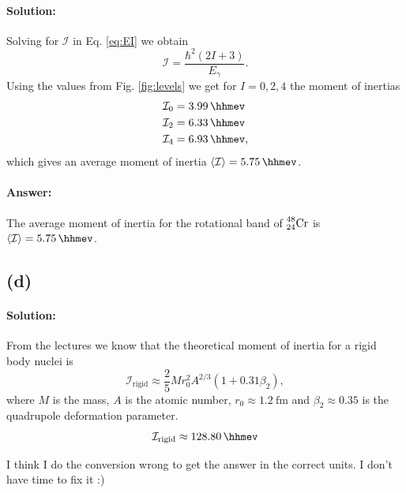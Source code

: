 \paragraph{Solution:} Solving for $\mathcal{I}$ in Eq. \eqref{eq:EI} we obtain
\begin{equation}
	\mathcal{I} = \frac{\hbar^2(2I + 3)}{E_\gamma}.
\end{equation}
Using the values from Fig. \ref{fig:levels} we get for $I = 0, 2, 4$ the moment of inertias
\begin{align}
	\mathcal{I}_0 &= \SI{3.99}{\hhmev}\\
	\mathcal{I}_2 &= \SI{6.33}{\hhmev}\\
	\mathcal{I}_4 &= \SI{6.93}{\hhmev},
\end{align}
which gives an average moment of inertia $\langle \mathcal{I} \rangle = \SI{5.75}{\hhmev}$.

\paragraph{Answer:} The average moment of inertia for the rotational band of $\nuc{Cr}{48}{24}$ is $\langle \mathcal{I} \rangle = \SI{5.75}{\hhmev}$.

\subsection*{(d)}
\paragraph{Solution:} From the lectures we know that the theoretical moment of inertia for a rigid body nuclei is 
\begin{equation}
	\mathcal{I}_\mathrm{rigid} \approx \frac{2}{5} M r_0^2 A^{2/3} (1 + 0.31 \beta_2),
\end{equation}
where $M$ is the mass, $A$ is the atomic number, $r_0 \approx \SI{1.2}{\femto\meter}$ and $\beta_2 \approx 0.35$ is the quadrupole deformation parameter.
\begin{equation}
	\mathcal{I}_\mathrm{rigid} \approx \SI{128.80}{\hhmev}
\end{equation}

I think I do the conversion wrong to get the answer in the correct units. I don't have time to fix it :)